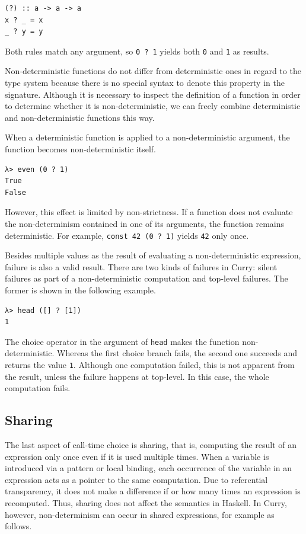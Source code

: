 \documentclass[a4paper, 11pt, fleqn, twoside, abstract=on]{scrreprt}
\newcommand{\hinl}[1]{\texttt{#1}}
\begin{document}
\begin{verbatim}
(?) :: a -> a -> a
x ? _ = x
_ ? y = y
\end{verbatim}
\noindent
Both rules match any argument, so \hinl{0 ? 1} yields both \hinl{0} and \hinl{1} as results.

Non-deterministic functions do not differ from deterministic ones in regard to the type system because there is no special syntax to denote this property in the signature.
Although it is necessary to inspect the definition of a function in order to determine whether it is non-deterministic, we can freely combine deterministic and non-deterministic functions this way.

When a deterministic function is applied to a non-deterministic argument, the function becomes non-deterministic itself.

\begin{verbatim}
λ> even (0 ? 1)
True
False
\end{verbatim}
\noindent
However, this effect is limited by non-strictness.
If a function does not evaluate the non-determinism contained in one of its arguments, the function remains deterministic.
For example, \hinl{const 42 (0 ? 1)} yields \hinl{42} only once.

Besides multiple values as the result of evaluating a non-deterministic expression, failure is also a valid result.
There are two kinds of failures in Curry: silent failures as part of a non-deterministic computation and top-level failures.
The former is shown in the following example.

\begin{verbatim}
λ> head ([] ? [1])
1
\end{verbatim}
\noindent
The choice operator in the argument of \hinl{head} makes the function non-deterministic.
Whereas the first choice branch fails, the second one succeeds and returns the value \hinl{1}.
Although one computation failed, this is not apparent from the result, unless the failure happens at top-level.
In this case, the whole computation fails.

\subsection{Sharing}
The last aspect of call-time choice is sharing, that is, computing the result of an expression only once even if it is used multiple times.
When a variable is introduced via a pattern or local binding, each occurrence of the variable in an expression acts as a pointer to the same computation.
Due to referential transparency, it does not make a difference if or how many times an expression is recomputed.
Thus, sharing does not affect the semantics in Haskell.
In Curry, however, non-determinism can occur in shared expressions, for example as follows.
\end{document}
